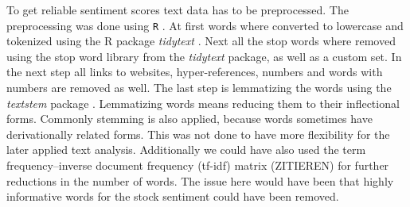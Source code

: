 To get reliable sentiment scores text data has to be preprocessed. The preprocessing was done using \texttt{R} \citep{Rproject}. At first words where converted to lowercase and tokenized using the R package \textit{tidytext} \citep{tidytext}. Next all the stop words where removed using the stop word library from the \textit{tidytext} package, as well as a custom set. In the next step all links to websites, hyper-references, numbers and words with numbers are removed as well. 
The last step is lemmatizing the words using the \textit{textstem} package \citep{textstem}. Lemmatizing words means reducing them to their inflectional forms. Commonly stemming is also applied, because words sometimes have derivationally related forms. This was not done to have more flexibility for the later applied text analysis. Additionally we could have also used the term frequency–inverse document frequency (tf-idf) matrix (ZITIEREN) for further reductions in the number of words. The issue here would have been that highly informative words for the stock sentiment could have been removed. 
